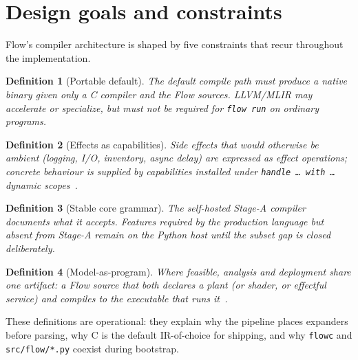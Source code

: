 \documentclass[11pt,a4paper]{article}
\newtheorem{definition}{Definition}
\theoremstyle{remark}
\begin{document}
\section{Design goals and constraints}
\label{sec:goals}

Flow's compiler architecture is shaped by five constraints that recur
throughout the implementation.

\begin{definition}[Portable default]
The default compile path must produce a native binary given only a C compiler
and the Flow sources. LLVM/MLIR may accelerate or specialize, but must not be
required for \texttt{flow run} on ordinary programs.
\end{definition}

\begin{definition}[Effects as capabilities]
Side effects that would otherwise be ambient (logging, I/O, inventory,
async delay) are expressed as effect operations; concrete behaviour is supplied
by capabilities installed under \texttt{handle \ldots\ with \ldots} dynamic
scopes~\cite{flow-effects}.
\end{definition}

\begin{definition}[Stable core grammar}
Domain vocabularies (linear dynamics blocks, fill shaders) may be authored in
dedicated surface syntax, but enter the compiler via expanders that emit
ordinary Flow before the recursive-descent parser runs.
\end{definition}

\begin{definition}[Honest subset boundaries]
The self-hosted Stage-A compiler documents what it accepts. Features required
by the production language but absent from Stage-A remain on the Python host
until the subset gap is closed deliberately.
\end{definition}

\begin{definition}[Model-as-program]
Where feasible, analysis and deployment share one artifact: a Flow source that
both declares a plant (or shader, or effectful service) and compiles to the
executable that runs it~\cite{flow-vision}.
\end{definition}

These definitions are operational: they explain why the pipeline places
expanders before parsing, why C is the default IR-of-choice for shipping, and
why \texttt{flowc} and \texttt{src/flow/*.py} coexist during bootstrap.
\end{document}
